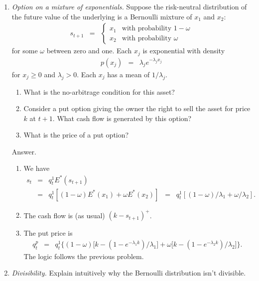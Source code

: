 \documentclass[11pt]{article}
\begin{document}
\begin{enumerate}
\item {\it Option on a mixture of exponentials.\/}
Suppose the risk-neutral distribution of the future value of the underlying
is a Bernoulli mixture of $x_1$ and $x_2$:
\begin{eqnarray*}
    s_{t+1} &=&
        \left\{
        \begin{array}{ll}
            x_1 & \mbox{with probability } 1-\omega \\
            x_2 & \mbox{with probability } \omega
        \end{array}
        \right.
\end{eqnarray*}
for some $\omega$ between zero and one.
Each $x_j$ is exponential with density
\begin{eqnarray*}
    p(x_j) &=& \lambda_j e^{-\lambda_j x_j}
\end{eqnarray*}
for $x_j \geq 0$ and $\lambda_j > 0$.
Each $x_j$ has a mean of $1/\lambda_j$.
%
\begin{enumerate}
\item What is the no-arbitrage condition for this asset?
\item Consider a put option giving the owner the right to sell
the asset for price $k$ at $t+1$.
What cash flow is generated by this option?
\item What is the price of a put option?
\end{enumerate}
%
Answer.
\begin{enumerate}
\item We have
\begin{eqnarray*}
    s_t &=& q^1_t E^* (s_{t+1}) \\
            &=& q^1_t [(1-\omega) E^*(x_1) + \omega E^*(x_2)]
            \;\;=\;\; q^1_t [(1-\omega)/\lambda_1 + \omega /\lambda_2] .
\end{eqnarray*}
\item The cash flow is (as usual) $ (k-s_{t+1})^+ $.
\item The put price is
\begin{eqnarray*}
    q^p_t &=& q^1_t \Big\{
        (1-\omega) \big[ k - ( 1-e^{-\lambda_1 k})/\lambda_1 \big]
        + \omega \big[ k - ( 1-e^{-\lambda_2 k})/\lambda_2 \big]
        \Big\} .
\end{eqnarray*}
The logic follows the previous problem.
\end{enumerate}

\item {\it Divisibility.\/} Explain intuitively why the Bernoulli distribution isn't divisible.


\end{enumerate}
\end{document}
